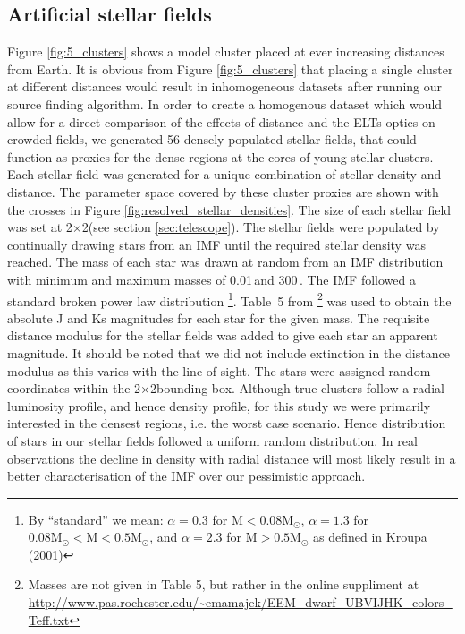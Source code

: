 \subsection{Artificial stellar fields}
Figure \ref{fig:5_clusters} shows a model cluster placed at ever increasing distances from Earth. 
It is obvious from Figure \ref{fig:5_clusters} that placing a single cluster at different distances would result in inhomogeneous datasets after running our source finding algorithm. 
In order to create a homogenous dataset which would allow for a direct comparison of the effects of distance and the ELTs optics on crowded fields, we generated 56 densely populated stellar fields, that could function as proxies for the dense regions at the cores of young stellar clusters. 
Each stellar field was generated for a unique combination of stellar density and distance.
The parameter space covered by these cluster proxies are shown with the crosses in Figure \ref{fig:resolved_stellar_densities}. 
The size of each stellar field was set at 2\arcsec$\times$2\arcsec (see section \ref{sec:telescope}). 
The stellar fields were populated by continually drawing stars from an IMF until the required stellar density was reached. 
The mass of each star was drawn at random from an IMF distribution with minimum and maximum masses of 0.01\,\msun and 300\,\msun. 
The IMF followed a standard \citet{kroupa2001} broken power law distribution %
\footnote{By ``standard'' we mean: $\alpha=0.3$ for $\mathrm{M} < 0.08 \mathrm{M}_\odot$, $\alpha=1.3$ for $0.08\mathrm{M}_\odot < \mathrm{M} < 0.5 \mathrm{M}_\odot$, and $\alpha=2.3$ for $\mathrm{M} > 0.5 \mathrm{M}_\odot$ as defined in Kroupa (2001)}. 
Table~5 from \citet{pecaut2013}\footnote{Masses are not given in Table 5, but rather in the online suppliment at \url{http://www.pas.rochester.edu/~emamajek/EEM_dwarf_UBVIJHK_colors_Teff.txt}}
was used to obtain the absolute J and Ks magnitudes for each star for the given mass. 
The requisite distance modulus for the stellar fields was added to give each star an apparent magnitude. 
It should be noted that we did not include extinction in the distance modulus as this varies with the line of sight. 
The stars were assigned random coordinates within the 2\arcsec$\times$2\arcsec bounding box. 
Although true clusters follow a radial luminosity profile, and hence density profile, for this study we were primarily interested in the densest regions, i.e. the worst case scenario. 
Hence distribution of stars in our stellar fields followed a uniform random distribution. 
In real observations the decline in density with radial distance will most likely result in a better characterisation of the IMF over our pessimistic approach.

